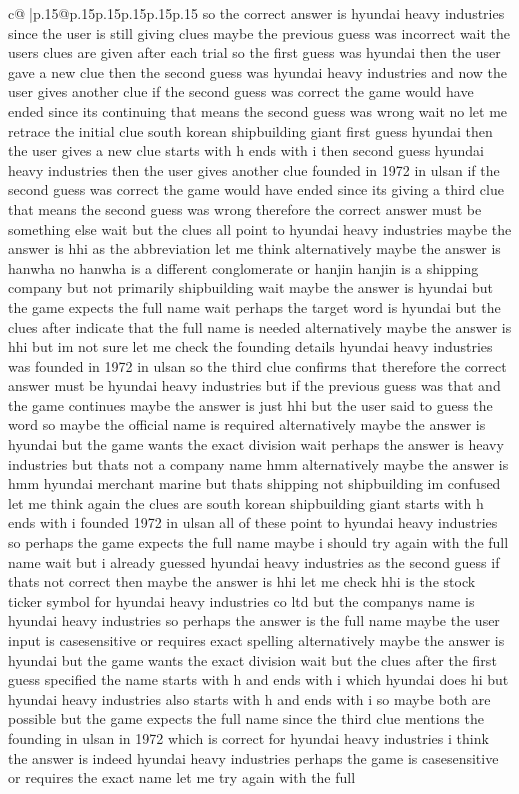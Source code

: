 \documentclass{article}
\begin{document}
{\begin{supertabular}{c@{$\;$}|p{.15\linewidth}@{}p{.15\linewidth}p{.15\linewidth}p{.15\linewidth}p{.15\linewidth}p{.15\linewidth}}
{{{so the correct answer is hyundai heavy industries since the user is still giving clues maybe the previous guess was incorrect wait the users clues are given after each trial so the first guess was hyundai then the user gave a new clue then the second guess was hyundai heavy industries and now the user gives another clue if the second guess was correct the game would have ended since its continuing that means the second guess was wrong wait no let me retrace the initial clue south korean shipbuilding giant first guess hyundai then the user gives a new clue starts with h ends with i then second guess hyundai heavy industries then the user gives another clue founded in 1972 in ulsan if the second guess was correct the game would have ended since its giving a third clue that means the second guess was wrong therefore the correct answer must be something else wait but the clues all point to hyundai heavy industries maybe the answer is hhi as the abbreviation let me think alternatively maybe the answer is hanwha no hanwha is a different conglomerate or hanjin hanjin is a shipping company but not primarily shipbuilding wait maybe the answer is hyundai but the game expects the full name wait perhaps the target word is hyundai but the clues after indicate that the full name is needed alternatively maybe the answer is hhi but im not sure let me check the founding details hyundai heavy industries was founded in 1972 in ulsan so the third clue confirms that therefore the correct answer must be hyundai heavy industries but if the previous guess was that and the game continues maybe the answer is just hhi but the user said to guess the word so maybe the official name is required alternatively maybe the answer is hyundai but the game wants the exact division wait perhaps the answer is heavy industries but thats not a company name hmm alternatively maybe the answer is hmm hyundai merchant marine but thats shipping not shipbuilding im confused let me think again the clues are south korean shipbuilding giant starts with h ends with i founded 1972 in ulsan all of these point to hyundai heavy industries so perhaps the game expects the full name maybe i should try again with the full name wait but i already guessed hyundai heavy industries as the second guess if thats not correct then maybe the answer is hhi let me check hhi is the stock ticker symbol for hyundai heavy industries co ltd but the companys name is hyundai heavy industries so perhaps the answer is the full name maybe the user input is casesensitive or requires exact spelling alternatively maybe the answer is hyundai but the game wants the exact division wait but the clues after the first guess specified the name starts with h and ends with i which hyundai does hi but hyundai heavy industries also starts with h and ends with i so maybe both are possible but the game expects the full name since the third clue mentions the founding in ulsan in 1972 which is correct for hyundai heavy industries i think the answer is indeed hyundai heavy industries perhaps the game is casesensitive or requires the exact name let me try again with the full }}}
\end{supertabular}}
\end{document}
